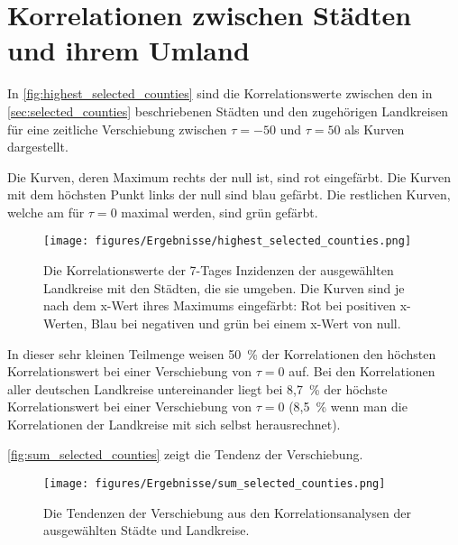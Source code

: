 \section{Korrelationen zwischen Städten und ihrem Umland}
In \autoref{fig:highest_selected_counties} sind die Korrelationswerte zwischen den in  \autoref{sec:selected_counties} beschriebenen Städten und den zugehörigen Landkreisen für eine zeitliche Verschiebung zwischen $\tau=-50$ und $\tau=50$ als Kurven dargestellt.

Die Kurven, deren Maximum rechts der null ist, sind rot eingefärbt. Die Kurven mit dem höchsten Punkt links der null sind blau gefärbt. Die restlichen Kurven, welche am für $\tau=0$ maximal werden, sind grün gefärbt.
\begin{figure}[H]
    \centering
    \texttt{[image: figures/Ergebnisse/highest\_selected\_counties.png]}
    \caption{Die Korrelationswerte der 7-Tages Inzidenzen der ausgewählten Landkreise mit den Städten, die sie umgeben. Die Kurven sind je nach dem x-Wert ihres Maximums eingefärbt: Rot bei positiven x-Werten, Blau bei negativen und grün bei einem x-Wert von null.}
    \label{fig:highest_selected_counties}
\end{figure}

In dieser sehr kleinen Teilmenge weisen 50~\% der Korrelationen den höchsten Korrelationswert bei einer Verschiebung von $\tau = 0$ auf.
Bei den Korrelationen aller deutschen Landkreise untereinander liegt bei 8,7~\% der höchste Korrelationswert bei einer Verschiebung von $\tau= 0$ (8,5~\% wenn man die Korrelationen der Landkreise mit sich selbst herausrechnet).

\autoref{fig:sum_selected_counties} zeigt die Tendenz der Verschiebung.
\begin{figure}
    \centering
    \texttt{[image: figures/Ergebnisse/sum\_selected\_counties.png]}
    \caption{Die Tendenzen der Verschiebung aus den Korrelationsanalysen der ausgewählten Städte und Landkreise.}
    \label{fig:sum_selected_counties}
\end{figure}